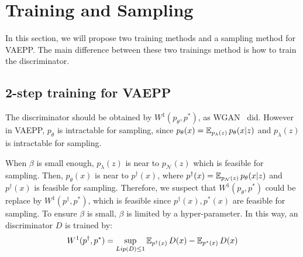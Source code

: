 \section{Training and Sampling}\label{sec:vaepp}
In this section, we will propose two training methods and a sampling method for VAEPP. The main difference between these two trainings method is how to train the discriminator. 

\subsection{2-step training for VAEPP} \label{subsec:naive_vaepp}
The discriminator should be obtained by $W^1(p_\theta, p^*)$, as WGAN~\cite{arjovsky2017wasserstein} did. However in VAEPP, $p_\theta$ is intractable for sampling, since $p_\theta(x) = \operatorname{\mathbb{E}}_{p_\lambda(z)} p_\theta(x|z)$ and $p_\lambda(z)$ is intractable for sampling. 

When $\beta$ is small enough, $p_\lambda(z)$ is near to $p_\mathcal{N}(z)$ which is feasible for sampling. Then, $p_\theta(x)$ is near to $p^\dag(x)$, where $p^\dag(x) = \operatorname{\mathbb{E}}_{p_\mathcal{N}(z)} p_\theta(x|z)$ and $p^\dag(x)$ is feasible for sampling. Therefore, we suspect that $W^1(p_\theta, p^*)$ could be replace by $W^1(p^\dag, p^*)$, which is feasible since $p^\dag(x), p^*(x)$ are feasible for sampling. To ensure $\beta$ is small, $\beta$ is limited by a hyper-parameter. 
In this way, an discriminator $D$ is trained by:
\begin{equation*}
	W^1(p^\dag, p^*) = \sup_{Lip(D) \leq 1} \operatorname{\mathbb{E}}_{p^\dag(x)} D(x) - \operatorname{\mathbb{E}}_{p^*(x)} D(x)
\end{equation*} 

